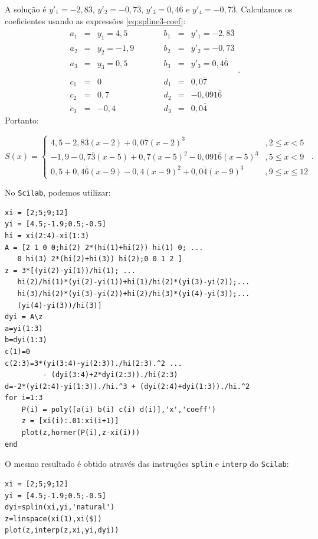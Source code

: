 \begin{sol}
A solução é  $y'_1=-2,8\bar{3}$, $y'_2=-0,7\bar{3}$, $y'_3=0,4\bar{6}$ e $y'_4=-0,7\bar{3}$. Calculamos os coeficientes usando as expressões \eqref{eq:spline3-coef}:
\begin{equation*}
\begin{array}{lclclcl}
a_1&=&y_1=4,5&\qquad&b_1 &=&y'_1=-2,8\bar{3}\\
a_2&=&y_2=-1,9&\qquad&b_2&=&y'_2=-0,7\bar{3}\\
a_3&=&y_3=0,5&\qquad&b_3&=&y'_3=0,4\bar{6}\\
&&&&&&\\
c_1&=&0&\qquad&d_1&=&0,0\bar{7}\\
c_2&=&0,7&\qquad&d_2&=&-0,091\bar{6}\\
c_3&=&-0,4&\qquad&d_3&=&0,0\bar{4}
\end{array}.
\end{equation*}
Portanto:
\begin{small}
\begin{equation*}
S(x)=\left\{\begin{array}{ll}
4,5-2,8\bar{3}(x-2)+0,0\bar{7}(x-2)^3 &\!, 2\leq x<5\\
-1,9-0,7\bar{3}(x-5)+0,7(x-5)^2-0,091\bar{6}(x-5)^3 &\!, 5\leq x<9\\
0,5+0,4\bar{6}(x-9)-0,4(x-9)^2+0,0\bar{4}(x-9)^3 &\!, 9\leq x\leq 12
\end{array}\right. .
\end{equation*}  
\end{small}

\ifisscilab
No \verb+Scilab+, podemos utilizar:
\begin{verbatim}
xi = [2;5;9;12]
yi = [4.5;-1.9;0.5;-0.5]
hi = xi(2:4)-xi(1:3)
A = [2 1 0 0;hi(2) 2*(hi(1)+hi(2)) hi(1) 0; ...
   0 hi(3) 2*(hi(2)+hi(3)) hi(2);0 0 1 2 ]
z = 3*[(yi(2)-yi(1))/hi(1); ...
   hi(2)/hi(1)*(yi(2)-yi(1))+hi(1)/hi(2)*(yi(3)-yi(2));...
   hi(3)/hi(2)*(yi(3)-yi(2))+hi(2)/hi(3)*(yi(4)-yi(3));...
   (yi(4)-yi(3))/hi(3)]
dyi = A\z
a=yi(1:3)
b=dyi(1:3)
c(1)=0
c(2:3)=3*(yi(3:4)-yi(2:3))./hi(2:3).^2 ...
         - (dyi(3:4)+2*dyi(2:3))./hi(2:3)
d=-2*(yi(2:4)-yi(1:3))./hi.^3 + (dyi(2:4)+dyi(1:3))./hi.^2
for i=1:3
    P(i) = poly([a(i) b(i) c(i) d(i)],'x','coeff')
    z = [xi(i):.01:xi(i+1)]
    plot(z,horner(P(i),z-xi(i)))
end
\end{verbatim}

O mesmo resultado é obtido através das instruções \verb+splin+ e \verb+interp+ do \verb+Scilab+:
\begin{verbatim}
xi = [2;5;9;12]
yi = [4.5;-1.9;0.5;-0.5]
dyi=splin(xi,yi,'natural')
z=linspace(xi(1),xi($))
plot(z,interp(z,xi,yi,dyi))
\end{verbatim}
\fi
\end{sol}

